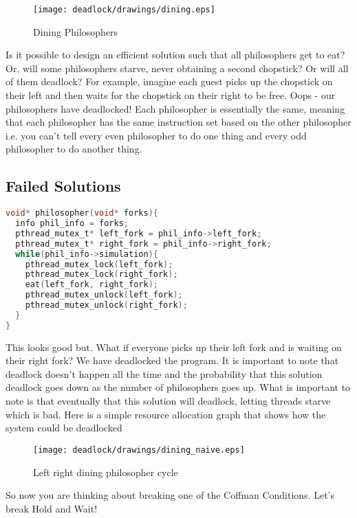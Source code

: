 \begin{figure}[H]
	\centering
	\texttt{[image: deadlock/drawings/dining.eps]}
	\caption{Dining Philosophers}
\end{figure}

Is it possible to design an efficient solution such that all philosophers get to eat?
Or, will some philosophers starve, never obtaining a second chopstick?
Or will all of them deadlock?
For example, imagine each guest picks up the chopstick on their left and then waits for the chopstick on their right to be free.
Oops - our philosophers have deadlocked!
Each philosopher is essentially the same, meaning that each philosopher has the same instruction set based on the other philosopher i.e. you can't tell every even philosopher to do one thing and every odd philosopher to do another thing.

\subsection{Failed Solutions}

\begin{lstlisting}[language=C]
void* philosopher(void* forks){
  info phil_info = forks;
  pthread_mutex_t* left_fork = phil_info->left_fork;
  pthread_mutex_t* right_fork = phil_info->right_fork;
  while(phil_info->simulation){
    pthread_mutex_lock(left_fork);
    pthread_mutex_lock(right_fork);
    eat(left_fork, right_fork);
    pthread_mutex_unlock(left_fork);
    pthread_mutex_unlock(right_fork);
  }
}
\end{lstlisting}

This looks good but.
What if everyone picks up their left fork and is waiting on their right fork? We have deadlocked the program.
It is important to note that deadlock doesn't happen all the time and the probability that this solution deadlock goes down as the number of philosophers goes up.
What is important to note is that eventually that this solution will deadlock, letting threads starve which is bad.
Here is a simple resource allocation graph that shows how the system could be deadlocked

\begin{figure}[H]
	\centering
	\texttt{[image: deadlock/drawings/dining\_naive.eps]}
	\caption{Left right dining philosopher cycle}
\end{figure}


So now you are thinking about breaking one of the Coffman Conditions.
Let's break Hold and Wait!

